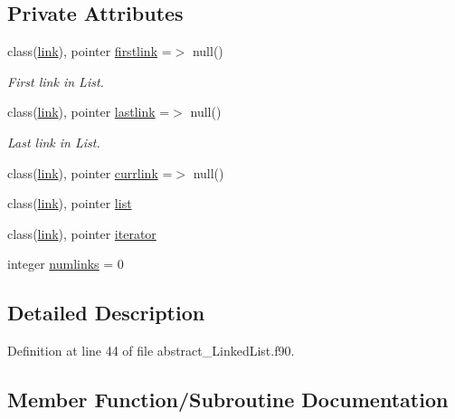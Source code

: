 \subsection*{Private Attributes}
\begin{DoxyCompactItemize}
\item 
class(\mbox{\hyperlink{structlink__mod_1_1link}{link}}), pointer \mbox{\hyperlink{structabstract__linkedlist__mod_1_1linkedlist_a1db1fbb6e3acfb39a2cab68396f31867}{firstlink}} =$>$ null()
\begin{DoxyCompactList}\small\item\em First link in List. \end{DoxyCompactList}\item 
class(\mbox{\hyperlink{structlink__mod_1_1link}{link}}), pointer \mbox{\hyperlink{structabstract__linkedlist__mod_1_1linkedlist_af9747ed213a31f13aef74f95f014a503}{lastlink}} =$>$ null()
\begin{DoxyCompactList}\small\item\em Last link in List. \end{DoxyCompactList}\item 
class(\mbox{\hyperlink{structlink__mod_1_1link}{link}}), pointer \mbox{\hyperlink{structabstract__linkedlist__mod_1_1linkedlist_a5039a762fe6e50feda0265f14386c478}{currlink}} =$>$ null()
\item 
class(\mbox{\hyperlink{structlink__mod_1_1link}{link}}), pointer \mbox{\hyperlink{structabstract__linkedlist__mod_1_1linkedlist_aa01c4be95b38ef7dd93c4cc550108f1d}{list}}
\item 
class(\mbox{\hyperlink{structlink__mod_1_1link}{link}}), pointer \mbox{\hyperlink{structabstract__linkedlist__mod_1_1linkedlist_a96f2e50678291a2552e6c2cc54bc288d}{iterator}}
\item 
integer \mbox{\hyperlink{structabstract__linkedlist__mod_1_1linkedlist_a943157fc98cf02c94ed8fb50379a5e62}{numlinks}} = 0
\end{DoxyCompactItemize}


\subsection{Detailed Description}


Definition at line 44 of file abstract\+\_\+\+Linked\+List.\+f90.



\subsection{Member Function/\+Subroutine Documentation}
\mbox{\label{structabstract__linkedlist__mod_1_1linkedlist_a4962955d0f6e8fc46cccaa41e5f32b67}} 
